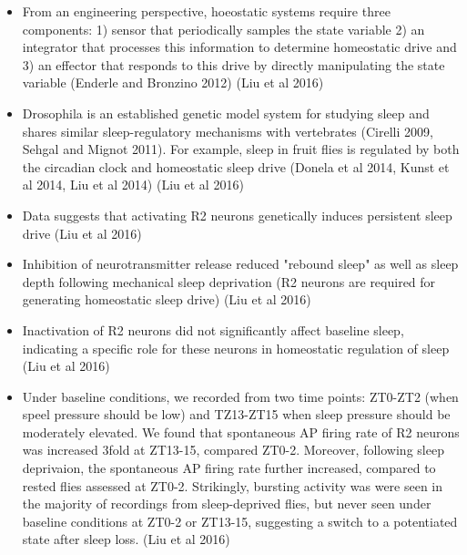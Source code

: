 \documentclass[11pt]{article}
\begin{document}
\begin{itemize}
    \item From an engineering perspective, hoeostatic systems require three components: 1) sensor that periodically samples
    the state variable 2) an integrator that processes this information to determine homeostatic drive and 3) an
    effector that responds to this drive by directly manipulating the state variable (Enderle and Bronzino 2012) \cite{liuSleepDriveEncoded2016}
    (Liu et al 2016)

    \item Drosophila is an established genetic model system for studying sleep and shares similar sleep-regulatory
    mechanisms with vertebrates (Cirelli 2009, Sehgal and Mignot 2011). For example, sleep in fruit flies is regulated by
    both the circadian clock and homeostatic sleep drive (Donela et al 2014, Kunst et al 2014, Liu et al 2014) \cite{liuSleepDriveEncoded2016}
    (Liu et al 2016)

    \item Data suggests that activating R2 neurons genetically induces persistent sleep drive \cite{liuSleepDriveEncoded2016}
    (Liu et al 2016)

    \item Inhibition of neurotransmitter release reduced "rebound sleep" as well as sleep depth following mechanical sleep deprivation
    (R2 neurons are required for generating homeostatic sleep drive) \cite{liuSleepDriveEncoded2016}
    (Liu et al 2016)

    \item Inactivation of R2 neurons did not significantly affect baseline sleep, indicating a specific role for these neurons in
    homeostatic regulation of sleep \cite{liuSleepDriveEncoded2016}
    (Liu et al 2016)

    \item Under baseline conditions, we recorded from two time points: ZT0-ZT2 (when speel pressure should be low)
    and TZ13-ZT15 when sleep pressure should be moderately elevated. We found that spontaneous AP firing rate of R2
    neurons was increased 3fold at ZT13-15, compared ZT0-2. Moreover, following sleep deprivaion, the spontaneous
    AP firing rate further increased, compared to rested flies assessed at ZT0-2. Strikingly, bursting activity
    was were seen in the majority of recordings from sleep-deprived flies, but never seen under baseline conditions at ZT0-2
    or ZT13-15, suggesting a switch to a potentiated state after sleep loss. \cite{liuSleepDriveEncoded2016}
    (Liu et al 2016)


\end{itemize}
\end{document}
